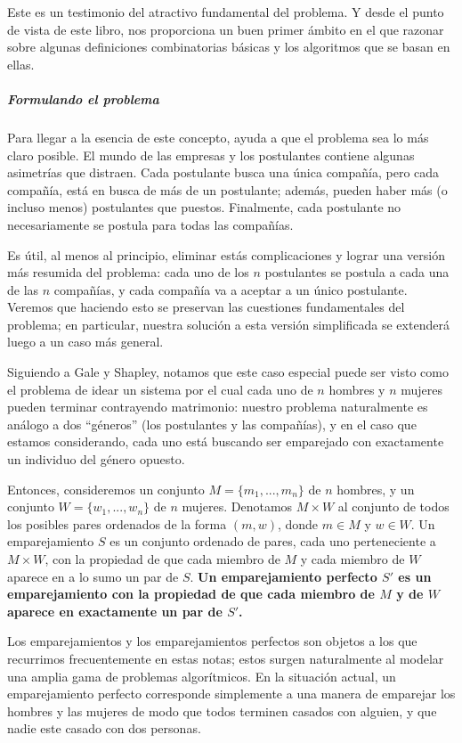 \documentclass[a4paper, 12pt]{book}
\theoremstyle{dotless}
\begin{document}
Este es un testimonio del atractivo fundamental del problema. Y desde el punto de vista de este libro, nos proporciona un buen primer ámbito en el que razonar sobre algunas definiciones combinatorias básicas y los algoritmos que se basan en ellas.

\subparagraph{Formulando el problema} Para llegar a la esencia de este concepto, ayuda a que el problema sea lo más claro posible. El mundo de las empresas y los postulantes contiene algunas asimetrías que distraen. Cada postulante busca una única compañía, pero cada compañía, está en busca de más de un postulante; además, pueden haber más (o incluso menos) postulantes que puestos. Finalmente, cada postulante no necesariamente se postula para todas las compañías.

Es útil, al menos al principio, eliminar estás complicaciones y lograr una versión más resumida del problema: cada uno de los $n$ postulantes se postula a cada una de las $n$ compañías, y cada compañía va a aceptar a un único postulante. Veremos que haciendo esto se preservan las cuestiones fundamentales del problema; en particular, nuestra solución a esta versión simplificada se extenderá luego a un caso más general.

Siguiendo a Gale y Shapley, notamos que este caso especial puede ser visto como el problema de idear un sistema por el cual cada uno de $n$ hombres y $n$ mujeres pueden terminar contrayendo matrimonio: nuestro problema naturalmente es análogo a dos ``géneros'' (los postulantes y las compañías), y en el caso que estamos considerando, cada uno está buscando ser emparejado con exactamente un individuo del género opuesto.

Entonces, consideremos un conjunto $M =\{m_1, ...,m_n\}$ de $n$ hombres, y un conjunto  $W =\{w_1, ...,w_n\}$ de $n$ mujeres. Denotamos $M \times W$ al conjunto de todos los posibles pares ordenados de la forma $(m, w)$, donde $m \in M$ y  $w \in W $. Un emparejamiento $S$ es un conjunto ordenado de pares, cada uno perteneciente a $M \times W$, con la propiedad de que cada miembro de $M$ y cada miembro de $W$ aparece en a lo sumo un par de $S$. \textbf{Un emparejamiento perfecto $S'$ es un emparejamiento con la propiedad de que cada miembro de $M$ y de $W$ aparece en exactamente un par de $S'$.}
 
Los emparejamientos y los emparejamientos perfectos son objetos a los que recurrimos frecuentemente en estas notas; estos surgen naturalmente al modelar una amplia gama de problemas algorítmicos. En la situación actual, un emparejamiento perfecto corresponde simplemente a una manera de emparejar los hombres y las mujeres de modo que todos terminen casados con alguien, y que nadie este casado con dos personas.
\end{document}
